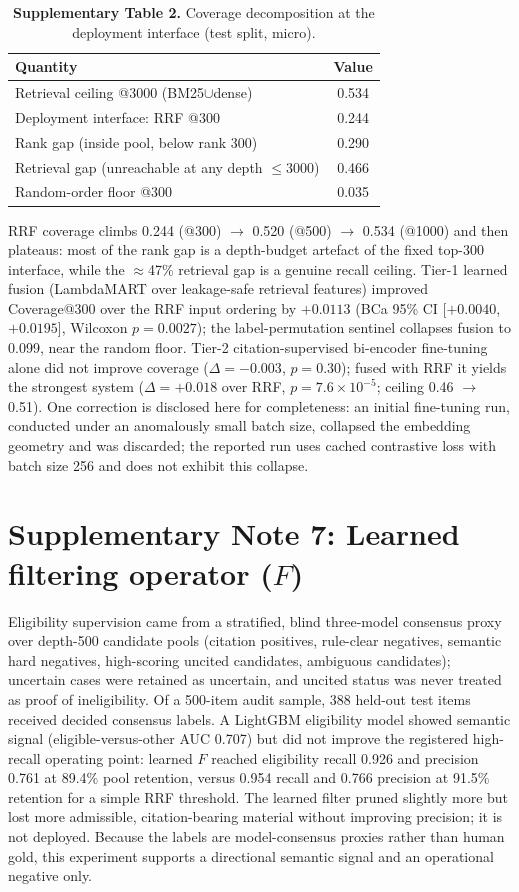 \documentclass[11pt,a4paper]{article}
\newcommand{\snote}[1]{\section*{Supplementary Note #1}}
\begin{document}
\begin{table}[h]
\caption*{\textbf{Supplementary Table 2.} Coverage decomposition at the deployment interface (test split, micro).}
\centering
\small
\begin{tabular}{@{}lc@{}}
\toprule
Quantity & Value \\
\midrule
Retrieval ceiling @3000 (BM25$\cup$dense) & 0.534 \\
Deployment interface: RRF @300 & 0.244 \\
Rank gap (inside pool, below rank 300) & 0.290 \\
Retrieval gap (unreachable at any depth $\le$3000) & 0.466 \\
Random-order floor @300 & 0.035 \\
\bottomrule
\end{tabular}
\end{table}

RRF coverage climbs 0.244 (@300) $\rightarrow$ 0.520 (@500) $\rightarrow$ 0.534 (@1000) and then plateaus: most of the rank gap is a depth-budget artefact of the fixed top-300 interface, while the $\approx$47\% retrieval gap is a genuine recall ceiling. Tier-1 learned fusion (LambdaMART over leakage-safe retrieval features) improved Coverage@300 over the RRF input ordering by $+0.0113$ (BCa 95\% CI [$+0.0040$, $+0.0195$], Wilcoxon $p=0.0027$); the label-permutation sentinel collapses fusion to 0.099, near the random floor. Tier-2 citation-supervised bi-encoder fine-tuning alone did not improve coverage ($\Delta=-0.003$, $p=0.30$); fused with RRF it yields the strongest system ($\Delta=+0.018$ over RRF, $p=7.6\times10^{-5}$; ceiling 0.46 $\rightarrow$ 0.51). One correction is disclosed here for completeness: an initial fine-tuning run, conducted under an anomalously small batch size, collapsed the embedding geometry and was discarded; the reported run uses cached contrastive loss with batch size 256 and does not exhibit this collapse.

\snote{7: Learned filtering operator ($F$)}

Eligibility supervision came from a stratified, blind three-model consensus proxy over depth-500 candidate pools (citation positives, rule-clear negatives, semantic hard negatives, high-scoring uncited candidates, ambiguous candidates); uncertain cases were retained as uncertain, and uncited status was never treated as proof of ineligibility. Of a 500-item audit sample, 388 held-out test items received decided consensus labels. A LightGBM eligibility model showed semantic signal (eligible-versus-other AUC 0.707) but did not improve the registered high-recall operating point: learned $F$ reached eligibility recall 0.926 and precision 0.761 at 89.4\% pool retention, versus 0.954 recall and 0.766 precision at 91.5\% retention for a simple RRF threshold. The learned filter pruned slightly more but lost more admissible, citation-bearing material without improving precision; it is not deployed. Because the labels are model-consensus proxies rather than human gold, this experiment supports a directional semantic signal and an operational negative only.
\end{document}
